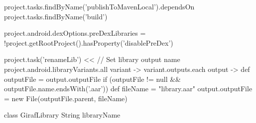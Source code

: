 \begin{gradlecode}[caption=Gradle Plugin to publish libraries,label=lst:gradle_plugin_library]
{{{            project.tasks.findByName('publishToMavenLocal').dependsOn project.tasks.findByName('build')

            project.android.dexOptions.preDexLibraries = !project.getRootProject().hasProperty('disablePreDex')
        }

        project.task('renameLib') << {
            // Set library output name
            project.android.libraryVariants.all { variant ->
                variant.outputs.each { output ->
                    def outputFile = output.outputFile
                    if (outputFile != null && outputFile.name.endsWith('.aar')) {
                        def fileName = "library.aar"
                        output.outputFile = new File(outputFile.parent, fileName)
                    }
                }
            }
        }
    }
}

class GirafLibrary {
    String libraryName
}
\end{gradlecode}